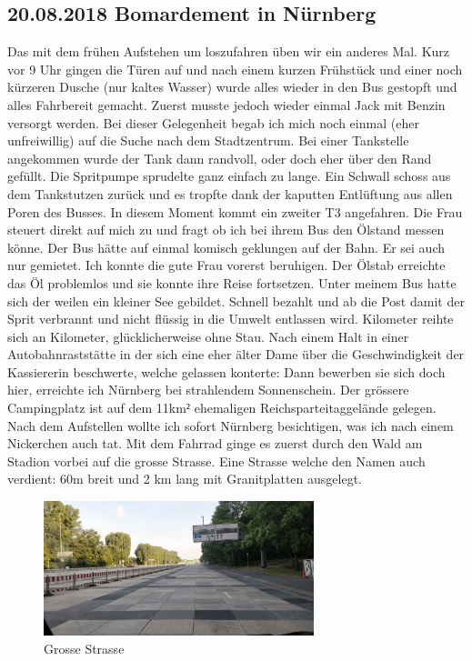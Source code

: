 \subsection{20.08.2018 Bomardement in Nürnberg}
Das mit dem frühen Aufstehen um loszufahren üben wir ein anderes Mal.
Kurz vor 9 Uhr gingen die Türen auf und nach einem kurzen Frühstück und einer noch kürzeren Dusche (nur kaltes Wasser) wurde alles wieder in den Bus gestopft und alles Fahrbereit gemacht.
Zuerst musste jedoch wieder einmal Jack mit Benzin versorgt werden.
Bei dieser Gelegenheit begab ich mich noch einmal (eher unfreiwillig) auf die Suche nach dem Stadtzentrum.
Bei einer Tankstelle angekommen wurde der Tank dann randvoll, oder doch eher über den Rand gefüllt.
Die Spritpumpe sprudelte ganz einfach zu lange.
Ein Schwall schoss aus dem Tankstutzen zurück und es tropfte dank der kaputten Entlüftung aus allen Poren des Busses.
In diesem Moment kommt ein zweiter T3 angefahren.
Die Frau steuert direkt auf mich zu und fragt ob ich bei ihrem Bus den Ölstand messen könne.
Der Bus hätte auf einmal komisch geklungen auf der Bahn.
Er sei auch nur gemietet.
Ich konnte die gute Frau vorerst beruhigen.
Der Ölstab erreichte das Öl problemlos und sie konnte ihre Reise fortsetzen.
Unter meinem Bus hatte sich der weilen ein kleiner See gebildet.
Schnell bezahlt und ab die Post damit der Sprit verbrannt und nicht flüssig in die Umwelt entlassen wird.
Kilometer reihte sich an Kilometer, glücklicherweise ohne Stau.
Nach einem Halt in einer Autobahnraststätte in der sich eine eher älter Dame über die Geschwindigkeit der Kassiererin beschwerte, welche gelassen konterte: Dann bewerben sie sich doch hier, erreichte ich Nürnberg bei strahlendem Sonnenschein.
Der grössere Campingplatz ist auf dem 11km$²$ ehemaligen Reichsparteitaggelände gelegen.
Nach dem Aufstellen wollte ich sofort Nürnberg besichtigen, was ich nach einem Nickerchen auch tat.
Mit dem Fahrrad ginge es zuerst durch  den Wald am Stadion vorbei auf die grosse Strasse.
Eine Strasse welche den Namen auch verdient: 60m breit und 2 km lang mit Granitplatten ausgelegt.

\begin{figure}[h]
    \centering
    \includegraphics[width=0.7\textwidth]{../Bilder/Sylt/71.png}
    \caption{Grosse Strasse}
    \label{img:Grosse Strasse}
\end{figure}

